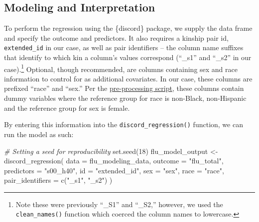 \documentclass[10pt,a4paper,onecolumn]{article}
\newenvironment{Shaded}{\begin{snugshade}}{\end{snugshade}}
\newcommand{\AttributeTok}[1]{\textcolor[rgb]{0.77,0.63,0.00}{#1}}
\newcommand{\CommentTok}[1]{\textcolor[rgb]{0.56,0.35,0.01}{\textit{#1}}}
\newcommand{\DecValTok}[1]{\textcolor[rgb]{0.00,0.00,0.81}{#1}}
\newcommand{\FunctionTok}[1]{\textcolor[rgb]{0.00,0.00,0.00}{#1}}
\newcommand{\NormalTok}[1]{#1}
\newcommand{\OtherTok}[1]{\textcolor[rgb]{0.56,0.35,0.01}{#1}}
\newcommand{\StringTok}[1]{\textcolor[rgb]{0.31,0.60,0.02}{#1}}
\begin{document}
\hypertarget{modeling-and-interpretation}{%
\subsection{Modeling and
Interpretation}\label{modeling-and-interpretation}}

To perform the regression using the \{discord\} package, we supply the
data frame and specify the outcome and predictors. It also requires a
kinship pair id, \texttt{extended\_id} in our case, as well as pair
identifiers -- the column name suffixes that identify to which kin a
column's values correspond (``\_s1'' and ``\_s2'' in our
case).\footnote{Note these were previously ``\_S1'' and ``\_S2,''
  however, we used the \texttt{clean\_names()} function which coerced
  the column names to lowercase.} Optional, though recommended, are
columns containing sex and race information to control for as additional
covariates. In our case, these columns are prefixed ``race'' and
``sex.'' Per the
\href{https://github.com/jdtrat/senior-thesis-discord/blob/main/R/preprocess-discord-flu.R}{pre-processing
script}, these columns contain dummy variables where the reference group
for race is non-Black, non-Hispanic and the reference group for sex is
female.

By entering this information into the \texttt{discord\_regression()}
function, we can run the model as such:

\begin{Shaded}
\begin{Highlighting}[]
\CommentTok{\# Setting a seed for reproducibility}
\FunctionTok{set.seed}\NormalTok{(}\DecValTok{18}\NormalTok{)}
\NormalTok{flu\_model\_output }\OtherTok{\textless{}{-}} \FunctionTok{discord\_regression}\NormalTok{(}
                          \AttributeTok{data =}\NormalTok{ flu\_modeling\_data,}
                          \AttributeTok{outcome =} \StringTok{"flu\_total"}\NormalTok{,}
                          \AttributeTok{predictors =} \StringTok{"s00\_h40"}\NormalTok{,}
                          \AttributeTok{id =} \StringTok{"extended\_id"}\NormalTok{,}
                          \AttributeTok{sex =} \StringTok{"sex"}\NormalTok{,}
                          \AttributeTok{race =} \StringTok{"race"}\NormalTok{,}
                          \AttributeTok{pair\_identifiers =} \FunctionTok{c}\NormalTok{(}\StringTok{"\_s1"}\NormalTok{, }\StringTok{"\_s2"}\NormalTok{)}
\NormalTok{                          )}
\end{Highlighting}
\end{Shaded}
\end{document}
